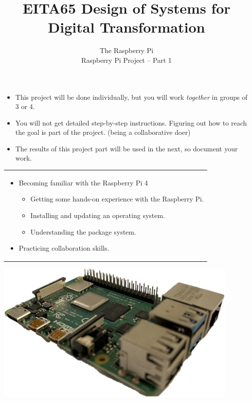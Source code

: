\documentclass{article}
\title{EITA65 Design of Systems for Digital Transformation\\\year}
\author{\huge The Raspberry Pi\\Raspberry Pi Project -- Part 1}
\date{}
\begin{document}
\clearpage\maketitle
\thispagestyle{empty}%

\begin{itemize}
\item This project will be done individually, but you will work \textit{together} in groups of 3 or 4.
\item You will not get detailed step-by-step instructions. Figuring out how to reach the goal is part of the project. (being a collaborative doer)
\item The results of this project part will be used in the next, so document your work.
\end{itemize}

\vspace{.1cm}
\begin{center}
\begin{tabular}{l}
\toprule[1.5pt]
\parbox{0.8\linewidth}{
\vspace{.2cm}{\Large Learning goals:}
\begin{itemize}
\item Becoming familiar with the Raspberry Pi 4
  \begin{itemize}
  \item Getting some hands-on experience with the Raspberry Pi.
  \item Installing and updating an operating system.
  \item Understanding the package system.
  \end{itemize}
\item Practicing collaboration skills.
\end{itemize}}\\
\bottomrule[1.5pt]
\end{tabular}
\end{center}
\vfill
\begin{center}
\includegraphics[width=120mm]{rpi4_no_bg.png}
\end{center}
\vspace{2cm}
\end{document}
